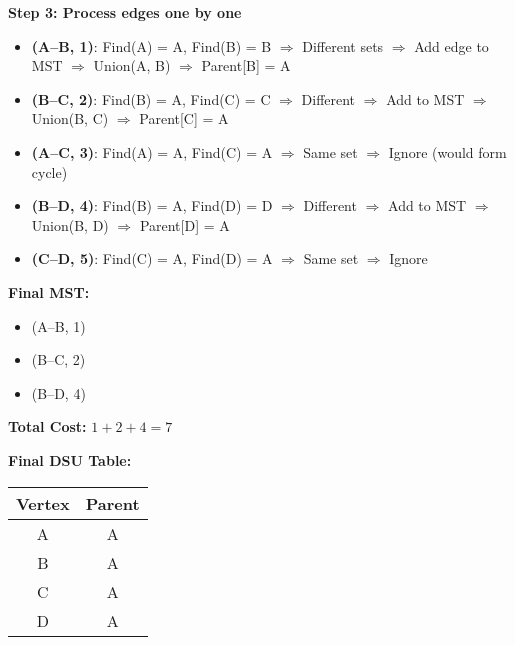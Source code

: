 \documentclass[a4paper,14pt]{extarticle}
\begin{document}
\vspace{1em}
\textbf{Step 3: Process edges one by one}

\begin{itemize}
  \item \textbf{(A--B, 1)}: Find(A) = A, Find(B) = B $\Rightarrow$ Different sets $\Rightarrow$ Add edge to MST  
  \quad $\Rightarrow$ Union(A, B) $\Rightarrow$ Parent[B] = A

  \item \textbf{(B--C, 2)}: Find(B) = A, Find(C) = C $\Rightarrow$ Different $\Rightarrow$ Add to MST  
  \quad $\Rightarrow$ Union(B, C) $\Rightarrow$ Parent[C] = A

  \item \textbf{(A--C, 3)}: Find(A) = A, Find(C) = A $\Rightarrow$ Same set $\Rightarrow$ Ignore (would form cycle)

  \item \textbf{(B--D, 4)}: Find(B) = A, Find(D) = D $\Rightarrow$ Different $\Rightarrow$ Add to MST  
  \quad $\Rightarrow$ Union(B, D) $\Rightarrow$ Parent[D] = A

  \item \textbf{(C--D, 5)}: Find(C) = A, Find(D) = A $\Rightarrow$ Same set $\Rightarrow$ Ignore
\end{itemize}


\vspace{1em}
\textbf{Final MST:}
\begin{itemize}
  \item (A--B, 1)
  \item (B--C, 2)
  \item (B--D, 4)
\end{itemize}

\textbf{Total Cost:} \(1 + 2 + 4 = 7\)

\vspace{1em}
\textbf{Final DSU Table:}

\begin{center}
\begin{tabular}{|c|c|}
\hline
Vertex & Parent \\
\hline
A & A \\
B & A \\
C & A \\
D & A \\
\hline
\end{tabular}
\end{center}

\newpage
\end{document}

